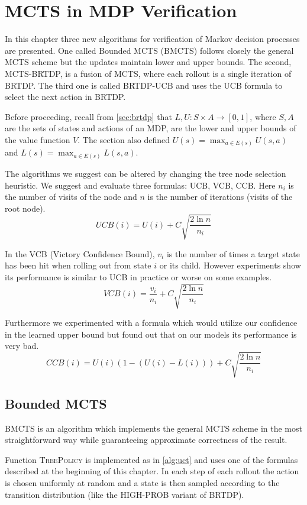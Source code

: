 \chapter{MCTS in MDP Verification}

In this chapter three new algorithms for verification of Markov decision
processes are presented. One called Bounded MCTS (BMCTS) follows
closely the general MCTS scheme but the updates maintain lower and upper
bounds. The second, MCTS-BRTDP, is a fusion of MCTS, where each
rollout is a single iteration of BRTDP.  The third one is called
BRTDP-UCB and uses the UCB formula to select the next action in BRTDP.

Before proceeding, recall from \autoref{sec:brtdp} that $L,U : S \times
A \to [0,1]$, where $S, A$ are the sets of states and actions of an MDP,
are the lower and upper bounds of the value function $V$.
The section also defined
$U(s) = \max_{a \in E(s)} U(s, a)$
and
$L(s) = \max_{a \in E(s)} L(s, a)$.

The algorithms we suggest can be altered by changing the tree node
selection heuristic. We suggest and evaluate three formulas: UCB, VCB,
CCB.  Here $n_i$ is the number of visits of the node and $n$ is the
number of iterations (visits of the root node).
\begin{equation*}
    UCB(i) = U(i) + C \sqrt{ \frac{2 \ln n}{n_i} }
\end{equation*}

In the VCB (Victory Confidence Bound), $v_i$ is the number of times a
target state has been hit when rolling out from state $i$ or its child.
However experiments show its performance is similar to UCB in
practice or worse on some examples.
\[
    VCB(i) = \frac{v_i}{n_i} + C \sqrt{ \frac{2 \ln n}{n_i} }
\]

Furthermore we experimented with a formula which would utilize our
confidence in the learned upper bound but found out that on our models
its performance is very bad.
\[
    CCB(i) = U(i) (1 - (U(i) - L(i))) + C \sqrt{ \frac{2 \ln n}{n_i} }
\]

\pagebreak

\section{Bounded MCTS}

BMCTS is an algorithm which implements the general MCTS scheme in the
most straightforward way while guaranteeing approximate correctness of
the result.

Function \textsc{TreePolicy} is implemented as in
\autoref{alg:uct} and uses one of the formulas
described at the beginning of this chapter.
In each step of each rollout the action is chosen
uniformly at random and a state is then sampled according to the
transition distribution (like the HIGH-PROB variant of BRTDP).


